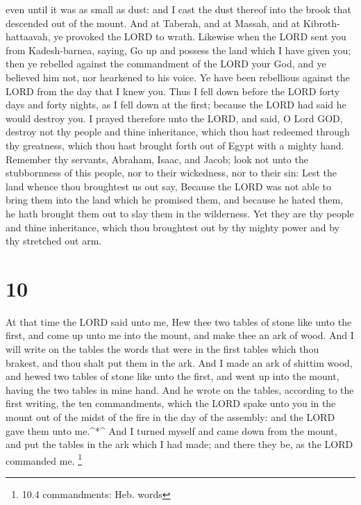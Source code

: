 even until it was as small as dust: and I cast the dust thereof into the
brook that descended out of the mount.  And at Taberah, and
at Massah, and at Kibroth-hattaavah, ye provoked the LORD to wrath.
 Likewise when the LORD sent you from Kadesh-barnea,
saying, Go up and possess the land which I have given you; then ye
rebelled against the commandment of the LORD your God, and ye believed
him not, nor hearkened to his voice.  Ye have been
rebellious against the LORD from the day that I knew you. 
Thus I fell down before the LORD forty days and forty nights, as I fell
down at the first; because the LORD had said he would destroy you.
 I prayed therefore unto the LORD, and said, O Lord GOD,
destroy not thy people and thine inheritance, which thou hast redeemed
through thy greatness, which thou hast brought forth out of Egypt with a
mighty hand.  Remember thy servants, Abraham, Isaac, and
Jacob; look not unto the stubbornness of this people, nor to their
wickedness, nor to their sin:  Lest the land whence thou
broughtest us out say, Because the LORD was not able to bring them into
the land which he promised them, and because he hated them, he hath
brought them out to slay them in the wilderness.  Yet they
are thy people and thine inheritance, which thou broughtest out by thy
mighty power and by thy stretched out arm.

\hypertarget{section-9}{%
\section{10}\label{section-9}}

 At that time the LORD said unto me, Hew thee two tables of
stone like unto the first, and come up unto me into the mount, and make
thee an ark of wood.  And I will write on the tables the
words that were in the first tables which thou brakest, and thou shalt
put them in the ark.  And I made an ark of shittim wood, and
hewed two tables of stone like unto the first, and went up into the
mount, having the two tables in mine hand.  And he wrote on
the tables, according to the first writing, the ten commandments, which
the LORD spake unto you in the mount out of the midst of the fire in the
day of the assembly: and the LORD gave them unto me.\^{}*\^{}
 And I turned myself and came down from the mount, and put
the tables in the ark which I had made; and there they be, as the LORD
commanded me. \footnote{10.4 commandments: Heb. words}

